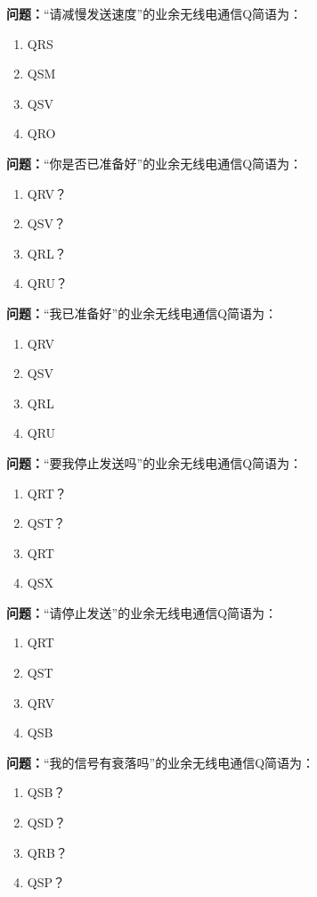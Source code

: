\bigskip


\noindent\textbf{问题：}“请减慢发送速度”的业余无线电通信Q简语为：
\begin{enumerate}[label=\Alph*), leftmargin=3em]
\item QRS
\item QSM
\item QSV
\item QRO
\end{enumerate}

\bigskip


\noindent\textbf{问题：}“你是否已准备好”的业余无线电通信Q简语为：
\begin{enumerate}[label=\Alph*), leftmargin=3em]
\item QRV？
\item QSV？
\item QRL？
\item QRU？
\end{enumerate}

\bigskip


\noindent\textbf{问题：}“我已准备好”的业余无线电通信Q简语为：
\begin{enumerate}[label=\Alph*), leftmargin=3em]
\item QRV
\item QSV
\item QRL
\item QRU
\end{enumerate}

\bigskip


\noindent\textbf{问题：}“要我停止发送吗”的业余无线电通信Q简语为：
\begin{enumerate}[label=\Alph*), leftmargin=3em]
\item QRT？
\item QST？
\item QRT
\item QSX
\end{enumerate}

\bigskip


\noindent\textbf{问题：}“请停止发送”的业余无线电通信Q简语为：
\begin{enumerate}[label=\Alph*), leftmargin=3em]
\item QRT
\item QST
\item QRV
\item QSB
\end{enumerate}

\bigskip


\noindent\textbf{问题：}“我的信号有衰落吗”的业余无线电通信Q简语为：
\begin{enumerate}[label=\Alph*), leftmargin=3em]
\item QSB？
\item QSD？
\item QRB？
\item QSP？
\end{enumerate}

